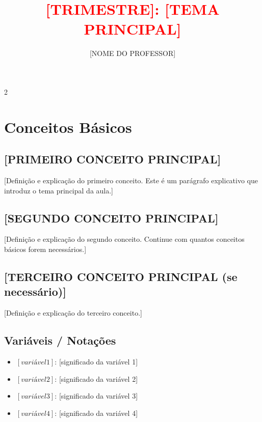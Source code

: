 \documentclass[11pt]{article}
\title{\textcolor{red}{[TRIMESTRE]: [TEMA PRINCIPAL]
    \\[SUBTÍTULO OU TÓPICO SECUNDÁRIO]}}
\author{[NOME DO PROFESSOR]}
\date{}
\begin{document}
\maketitle
\vspace{-1cm}

\begin{multicols}{2}

\section*{Conceitos Básicos}

\subsection*{[PRIMEIRO CONCEITO PRINCIPAL]}
[Definição e explicação do primeiro conceito. Este é um parágrafo explicativo que introduz o tema principal da aula.]

\subsection*{[SEGUNDO CONCEITO PRINCIPAL]}
[Definição e explicação do segundo conceito. Continue com quantos conceitos básicos forem necessários.]

\subsection*{[TERCEIRO CONCEITO PRINCIPAL (se necessário)]}
[Definição e explicação do terceiro conceito.]

\subsection*{Variáveis / Notações}
\begin{itemize}
\item $[variável1]$: [significado da variável 1]
\item $[variável2]$: [significado da variável 2]
\item $[variável3]$: [significado da variável 3]
\item $[variável4]$: [significado da variável 4]
\end{itemize}


\end{multicols}
\end{document}
